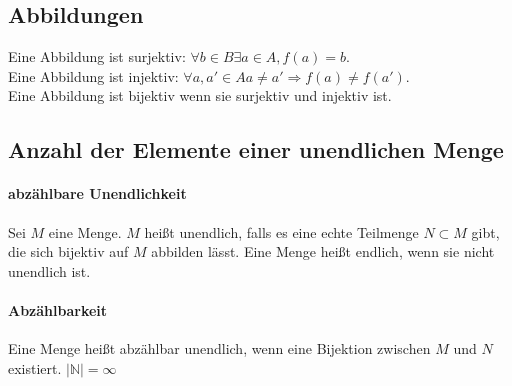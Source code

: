\subsection{Abbildungen}
Eine Abbildung ist {\sc surjektiv}: $\forall b \in B \exists a \in A, f(a) = b$.\\
Eine Abbildung ist {\sc injektiv}: $\forall a,a' \in A a\neq a' \Rightarrow f(a) \neq f(a')$.\\
Eine Abbildung ist {\sc bijektiv} wenn sie surjektiv und injektiv ist.

\subsection{Anzahl der Elemente einer unendlichen Menge}
\paragraph{abzählbare Unendlichkeit} Sei $M$ eine Menge. $M$ heißt  unendlich, falls es eine echte Teilmenge $N\subset M$ gibt, die sich bijektiv auf $M$ abbilden lässt. Eine Menge heißt endlich, wenn sie nicht unendlich ist.
\paragraph{Abzählbarkeit} Eine Menge heißt abzählbar unendlich, wenn eine Bijektion zwischen $M$ und $N$ existiert. $|\mathbb{N}| = \infty$
